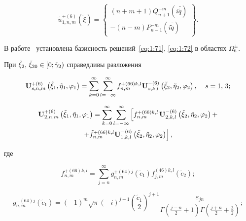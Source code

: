 \begin{equation}\label{eq:1:77}
\tilde u_{1,n,m}^{ \pm (6)}(\tilde \xi ) = \left\{ \begin{array}{l}
(n + m + 1)Q_{n + 1}^{ - m}(i\bar \tilde q)\\
 - (n - m)P_{n - 1}^{ - m}(i\bar \tilde q)
\end{array} \right\}.
\end{equation}

В работе~\cite{Nikolaev1998} установлена базисность решений~\eqref{eq:1:71}, \eqref{eq:1:72} в областях $\Omega _6^ \pm $.

\begin{theorem}
При ${\tilde \xi _2},{\mkern 1mu} {\kern 1pt} {\tilde \xi _{20}} \in \left[ {0;{{\tilde \gamma }_2}} \right)$ справедливы разложения

\begin{equation}\label{eq:1:78}
{\bf{U}}_{s,n,m}^{ + (6)}\left( {{{\tilde \xi }_1},{{\tilde \eta }_1},{\varphi _1}} \right) = \sum\limits_{k = 0}^\infty  {\sum\limits_{l =  - \infty }^\infty  {f_{n,m}^{ + (66)k,l}} } {\bf{U}}_{s,k,l}^{ - (6)}\left( {{{\tilde \xi }_2},{{\tilde \eta }_2},{\varphi _2}} \right), \quad {\kern 1pt} s = 1,{\mkern 1mu} {\kern 1pt} 3;
\end{equation}

\begin{multline}\label{eq:1:79}
{\bf{U}}_{2,n,m}^{ + (6)}\left( {{{\tilde \xi }_1},{{\tilde \eta }_1},{\varphi _1}} \right) = \sum\limits_{k = 0}^\infty  {\sum\limits_{l =  - \infty }^\infty  {\left[ {f_{n,m}^{ + (66)k,l}} \right.} } {\bf{U}}_{2,k,l}^{ - (6)}\left( {{{\tilde \xi }_2},{{\tilde \eta }_2},{\varphi _2}} \right) + \\
\left. { + \tilde f_{n,m}^{ + (66)k,l}{\bf{U}}_{1,k,l}^{ - (6)}\left( {{{\tilde \xi }_2},{{\tilde \eta }_2},{\varphi _2}} \right)} \right],
\end{multline}

\noindent где

\begin{equation}\label{eq:1:80}
f_{n,m}^{ + (66)k,l} = \sum\limits_{j = n}^\infty  {g_{n,m}^{ + (64)j}} ({\tilde c_1})f_{j,m}^{(46)k,l}({\tilde c_2});
\end{equation}

\begin{equation}\label{eq:1:81}
g_{n,m}^{ + (64)j}({\tilde c_1}) = {( - 1)^m}\sqrt \pi  {( - i)^{j + 1}}{\left( {\frac{{{{\tilde c}_1}}}{2}} \right)^{j + 1}}\frac{{{\varepsilon _{jn}}}}{{\Gamma \left( {\frac{{j - n}}{2} + 1} \right)\Gamma \left( {\frac{{j + n}}{2} + \frac{3}{2}} \right)}};
\end{equation}


\end{theorem}
